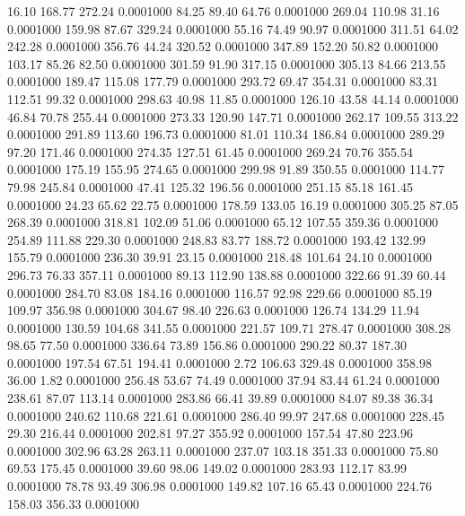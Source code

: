   16.10  168.77  272.24   0.0001000
  84.25   89.40   64.76   0.0001000
 269.04  110.98   31.16   0.0001000
 159.98   87.67  329.24   0.0001000
  55.16   74.49   90.97   0.0001000
 311.51   64.02  242.28   0.0001000
 356.76   44.24  320.52   0.0001000
 347.89  152.20   50.82   0.0001000
 103.17   85.26   82.50   0.0001000
 301.59   91.90  317.15   0.0001000
 305.13   84.66  213.55   0.0001000
 189.47  115.08  177.79   0.0001000
 293.72   69.47  354.31   0.0001000
  83.31  112.51   99.32   0.0001000
 298.63   40.98   11.85   0.0001000
 126.10   43.58   44.14   0.0001000
  46.84   70.78  255.44   0.0001000
 273.33  120.90  147.71   0.0001000
 262.17  109.55  313.22   0.0001000
 291.89  113.60  196.73   0.0001000
  81.01  110.34  186.84   0.0001000
 289.29   97.20  171.46   0.0001000
 274.35  127.51   61.45   0.0001000
 269.24   70.76  355.54   0.0001000
 175.19  155.95  274.65   0.0001000
 299.98   91.89  350.55   0.0001000
 114.77   79.98  245.84   0.0001000
  47.41  125.32  196.56   0.0001000
 251.15   85.18  161.45   0.0001000
  24.23   65.62   22.75   0.0001000
 178.59  133.05   16.19   0.0001000
 305.25   87.05  268.39   0.0001000
 318.81  102.09   51.06   0.0001000
  65.12  107.55  359.36   0.0001000
 254.89  111.88  229.30   0.0001000
 248.83   83.77  188.72   0.0001000
 193.42  132.99  155.79   0.0001000
 236.30   39.91   23.15   0.0001000
 218.48  101.64   24.10   0.0001000
 296.73   76.33  357.11   0.0001000
  89.13  112.90  138.88   0.0001000
 322.66   91.39   60.44   0.0001000
 284.70   83.08  184.16   0.0001000
 116.57   92.98  229.66   0.0001000
  85.19  109.97  356.98   0.0001000
 304.67   98.40  226.63   0.0001000
 126.74  134.29   11.94   0.0001000
 130.59  104.68  341.55   0.0001000
 221.57  109.71  278.47   0.0001000
 308.28   98.65   77.50   0.0001000
 336.64   73.89  156.86   0.0001000
 290.22   80.37  187.30   0.0001000
 197.54   67.51  194.41   0.0001000
   2.72  106.63  329.48   0.0001000
 358.98   36.00    1.82   0.0001000
 256.48   53.67   74.49   0.0001000
  37.94   83.44   61.24   0.0001000
 238.61   87.07  113.14   0.0001000
 283.86   66.41   39.89   0.0001000
  84.07   89.38   36.34   0.0001000
 240.62  110.68  221.61   0.0001000
 286.40   99.97  247.68   0.0001000
 228.45   29.30  216.44   0.0001000
 202.81   97.27  355.92   0.0001000
 157.54   47.80  223.96   0.0001000
 302.96   63.28  263.11   0.0001000
 237.07  103.18  351.33   0.0001000
  75.80   69.53  175.45   0.0001000
  39.60   98.06  149.02   0.0001000
 283.93  112.17   83.99   0.0001000
  78.78   93.49  306.98   0.0001000
 149.82  107.16   65.43   0.0001000
 224.76  158.03  356.33   0.0001000

